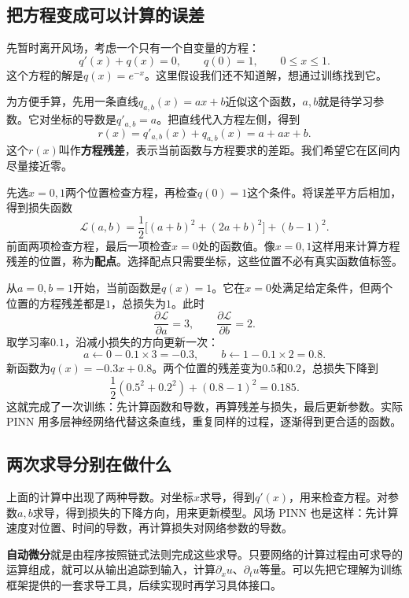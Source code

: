 \subsection{把方程变成可以计算的误差}
先暂时离开风场，考虑一个只有一个自变量的方程：
\begin{equation}
 q'(x)+q(x)=0,\qquad q(0)=1,\qquad 0\leq x\leq1.
 \label{eq:pinn-hand-ode}
\end{equation}
这个方程的解是$q(x)=e^{-x}$。这里假设我们还不知道解，想通过训练找到它。

为方便手算，先用一条直线$q_{a,b}(x)=ax+b$近似这个函数，$a,b$就是待学习参数。它对坐标的导数是$q'_{a,b}=a$。把直线代入方程左侧，得到
\[
 r(x)=q'_{a,b}(x)+q_{a,b}(x)=a+ax+b.
\]
这个$r(x)$叫作\textbf{方程残差}，表示当前函数与方程要求的差距。我们希望它在区间内尽量接近零。

先选$x=0,1$两个位置检查方程，再检查$q(0)=1$这个条件。将误差平方后相加，得到损失函数
\begin{equation}
 \mathcal L(a,b)=\frac12\big[(a+b)^2+(2a+b)^2\big]+(b-1)^2.
 \label{eq:pinn-hand-loss}
\end{equation}
前面两项检查方程，最后一项检查$x=0$处的函数值。像$x=0,1$这样用来计算方程残差的位置，称为\textbf{配点}。选择配点只需要坐标，这些位置不必有真实函数值标签。

从$a=0,b=1$开始，当前函数是$q(x)=1$。它在$x=0$处满足给定条件，但两个位置的方程残差都是$1$，总损失为$1$。此时
\[
 \frac{\partial\mathcal L}{\partial a}=3,\qquad
 \frac{\partial\mathcal L}{\partial b}=2.
\]
取学习率$0.1$，沿减小损失的方向更新一次：
\[
 a\leftarrow0-0.1\times3=-0.3,\qquad
 b\leftarrow1-0.1\times2=0.8.
\]
新函数为$q(x)=-0.3x+0.8$。两个位置的残差变为$0.5$和$0.2$，总损失下降到
\[
 \frac12(0.5^2+0.2^2)+(0.8-1)^2=0.185.
\]
这就完成了一次训练：先计算函数和导数，再算残差与损失，最后更新参数。实际 PINN 用多层神经网络代替这条直线，重复同样的过程，逐渐得到更合适的函数。

\subsection{两次求导分别在做什么}
上面的计算中出现了两种导数。对坐标$x$求导，得到$q'(x)$，用来检查方程。对参数$a,b$求导，得到损失的下降方向，用来更新模型。风场 PINN 也是这样：先计算速度对位置、时间的导数，再计算损失对网络参数的导数。

\textbf{自动微分}就是由程序按照链式法则完成这些求导。只要网络的计算过程由可求导的运算组成，就可以从输出追踪到输入，计算$\partial_xu$、$\partial_tu$等量。可以先把它理解为训练框架提供的一套求导工具，后续实现时再学习具体接口。

